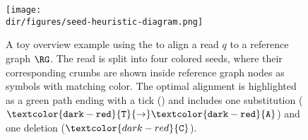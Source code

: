 \begin{figure}[t]
    \centering
	\texttt{[image: \\dir/figures/seed-heuristic-diagram.png]}
	\caption{%
		A toy overview example using the \seedh to align a read $q$ to a
		reference graph $\RG$. The read is split into four colored seeds, where
		their corresponding crumbs are shown inside reference graph nodes as
		symbols with matching color. The optimal alignment is highlighted as a
		green path ending with a tick (\protect\greentick{}) and includes one
		substitution
		($\mathtt{\textcolor{dark-red}{T}{\rightarrow}\textcolor{dark-red}{A}}$)
		and one deletion ($\textcolor{dark-red}{\mathtt{C}}$).
	}
\label{SEEDfig:overview}
\end{figure}